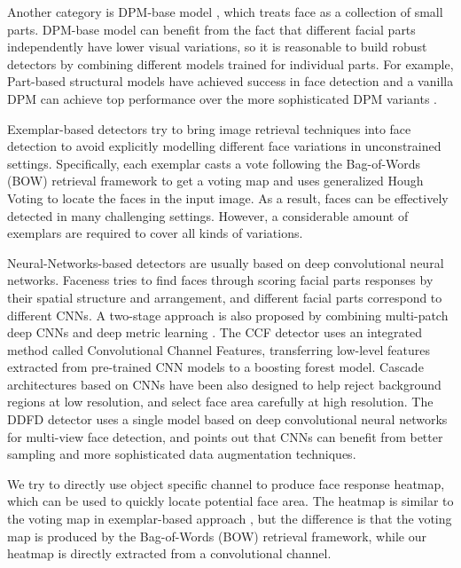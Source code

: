 \documentclass[10pt,twocolumn,letterpaper]{article}
\begin{document}
Another category is DPM-base model \cite{felzenszwalb2010object}, which treats face as a collection of small parts. DPM-base model can benefit from the fact that different facial parts independently have lower visual variations, so it is reasonable to build robust detectors by combining different models trained for individual parts. For example, Part-based structural models \cite{yan2014face,zhu2012face,yan2014fastest} have achieved success in face detection and a vanilla DPM can achieve top performance over the more sophisticated DPM variants \cite{mathias2014face}.



Exemplar-based detectors \cite{shen2013detecting,li2014efficient,kumar2015visual} try to bring image retrieval techniques into face detection to avoid explicitly modelling different face variations in unconstrained settings. Specifically, each exemplar casts a vote following the Bag-of-Words (BOW) \cite{shekhar2012word} retrieval framework to get a voting map and uses generalized Hough Voting \cite{leibe2004combined} to locate the faces in the input image. As a result, faces can be effectively detected in many challenging settings. However, a considerable amount of exemplars are required to cover all kinds of variations.

Neural-Networks-based detectors are usually based on deep convolutional neural networks. Faceness \cite{yang2015facial} tries to find faces through scoring facial parts responses by their spatial structure and arrangement, and different facial parts correspond to different CNNs. A two-stage approach is also proposed by combining multi-patch deep CNNs and deep metric learning \cite{liu2015targeting}. The CCF detector \cite{yang2015convolutional} uses an integrated method called Convolutional Channel Features, transferring low-level features extracted from pre-trained CNN models to a boosting forest model. Cascade architectures based on CNNs \cite{li2015convolutional} have been also designed to help reject background regions at low resolution, and select face area carefully at high resolution. The DDFD detector \cite{farfade2015multi} uses a single model based on deep convolutional neural networks for multi-view face detection, and points out that CNNs can benefit from better sampling and more sophisticated data augmentation techniques.

We try to directly use object specific channel to produce face response heatmap, which can be used to quickly locate potential face area. The heatmap is similar to the voting map in exemplar-based approach \cite{li2014efficient,kumar2015visual}, but the difference is that the voting map is produced by the Bag-of-Words (BOW) \cite{shekhar2012word} retrieval framework, while our heatmap is directly extracted from a convolutional channel.
\end{document}

